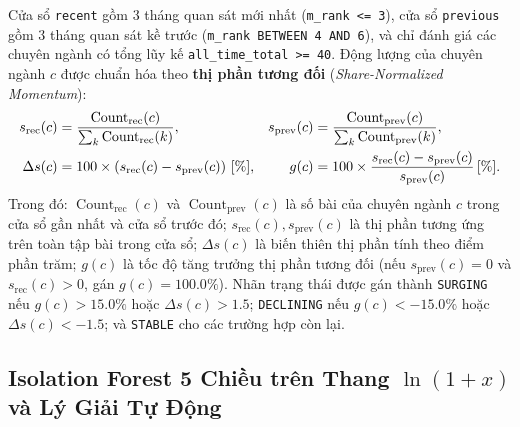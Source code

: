 Cửa sổ \texttt{recent} gồm 3 tháng quan sát mới nhất (\texttt{m\_rank <= 3}), cửa sổ \texttt{previous} gồm 3 tháng quan sát kề trước (\texttt{m\_rank BETWEEN 4 AND 6}), và chỉ đánh giá các chuyên ngành có tổng lũy kế \texttt{all\_time\_total >= 40}. Động lượng của chuyên ngành $c$ được chuẩn hóa theo \textbf{thị phần tương đối} (\textit{Share-Normalized Momentum}):
\begin{align}
  s_{\text{rec}}(c) &= \frac{\operatorname{Count}_{\text{rec}}(c)}{\sum_{k} \operatorname{Count}_{\text{rec}}(k)}, &
  s_{\text{prev}}(c) &= \frac{\operatorname{Count}_{\text{prev}}(c)}{\sum_{k} \operatorname{Count}_{\text{prev}}(k)}, \notag \\
  \Delta s(c) &= 100 \times \left(s_{\text{rec}}(c) - s_{\text{prev}}(c)\right)\,[\%], &
  g(c) &= 100 \times \frac{s_{\text{rec}}(c) - s_{\text{prev}}(c)}{s_{\text{prev}}(c)}\,[\%].
  \label{eq:ch4_share_momentum}
\end{align}
Trong đó: $\operatorname{Count}_{\text{rec}}(c)$ và $\operatorname{Count}_{\text{prev}}(c)$ là số bài của chuyên ngành $c$ trong cửa sổ gần nhất và cửa sổ trước đó; $s_{\text{rec}}(c), s_{\text{prev}}(c)$ là thị phần tương ứng trên toàn tập bài trong cửa sổ; $\Delta s(c)$ là biến thiên thị phần tính theo điểm phần trăm; $g(c)$ là tốc độ tăng trưởng thị phần tương đối (nếu $s_{\text{prev}}(c) = 0$ và $s_{\text{rec}}(c) > 0$, gán $g(c) = 100.0\%$). Nhãn trạng thái được gán thành \texttt{SURGING} nếu $g(c) > 15.0\%$ hoặc $\Delta s(c) > 1.5$; \texttt{DECLINING} nếu $g(c) < -15.0\%$ hoặc $\Delta s(c) < -1.5$; và \texttt{STABLE} cho các trường hợp còn lại.

\subsection{\texorpdfstring{Isolation Forest 5 Chiều trên Thang $\ln(1+x)$ và Lý Giải Tự Động}{Isolation Forest 5 Chieu tren Thang ln(1+x) va Ly Giai Tu Dong}}
\label{sec:ch4_iforest}

